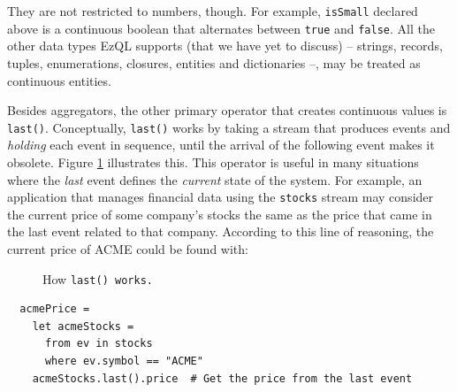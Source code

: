 They are not restricted to numbers, though. For example,
\verb=isSmall= declared above is a continuous boolean that alternates
between \verb=true= and \verb=false=. All the other data types EzQL
supports (that we have yet to discuss) -- strings, records, tuples,
enumerations, closures, entities and dictionaries --, may be treated
as continuous entities.

Besides aggregators, the other primary operator that creates
continuous values is \verb=last()=. Conceptually, \verb=last()= works
by taking a stream that produces events and \emph{holding} each event
in sequence, until the arrival of the following event makes it
obsolete. Figure \ref{fig:last} illustrates this. This operator is
useful in many situations where the \emph{last} event defines the
\emph{current} state of the system. For example, an application that
manages financial data using the \verb=stocks= stream may consider the
current price of some company's stocks the same as the price that came
in the last event related to that company. According to this line of
reasoning, the current price of ACME could be found with:

\begin{figure}[t]
  \centering
  \caption{How \tt last() \rm works.}
  \label{fig:last}
\end{figure}


\begin{lstlisting}
  acmePrice =
    let acmeStocks =
      from ev in stocks
      where ev.symbol == "ACME"
    acmeStocks.last().price	 # Get the price from the last event
\end{lstlisting}

